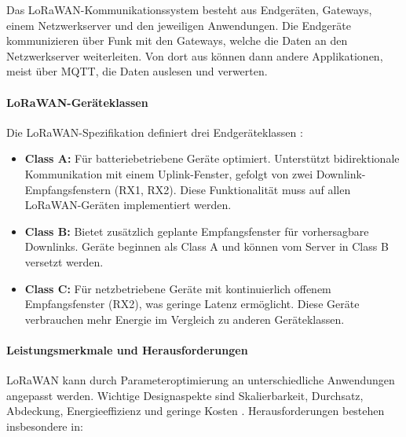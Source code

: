 Das LoRaWAN-Kommunikationssystem besteht aus Endgeräten, Gateways, einem Netzwerkserver und den jeweiligen Anwendungen. Die Endgeräte kommunizieren über Funk mit den Gateways, welche die Daten an den Netzwerkserver weiterleiten. Von dort aus können dann andere Applikationen, meist über MQTT, die Daten auslesen und verwerten. 

\paragraph*{LoRaWAN-Geräteklassen}
Die LoRaWAN-Spezifikation definiert drei Endgeräteklassen \autocite{sornin2015lorawan}:

\begin{itemize}
    \item \textbf{Class A:} Für batteriebetriebene Geräte optimiert. Unterstützt bidirektionale Kommunikation mit einem Uplink-Fenster, gefolgt von zwei Downlink-Empfangsfenstern (RX1, RX2). Diese Funktionalität muss auf allen LoRaWAN-Geräten implementiert werden.
    
    \item \textbf{Class B:} Bietet zusätzlich geplante Empfangsfenster für vorhersagbare Downlinks. Geräte beginnen als Class A und können vom Server in Class B versetzt werden.
    
    \item \textbf{Class C:} Für netzbetriebene Geräte mit kontinuierlich offenem Empfangsfenster (RX2), was geringe Latenz ermöglicht. Diese Geräte verbrauchen mehr Energie im Vergleich zu anderen Geräteklassen.
\end{itemize}

\paragraph*{Leistungsmerkmale und Herausforderungen}
LoRaWAN kann durch Parameteroptimierung an unterschiedliche Anwendungen angepasst werden. Wichtige Designaspekte sind Skalierbarkeit, Durchsatz, Abdeckung, Energieeffizienz und geringe Kosten \cite{bor2017lora}. Herausforderungen bestehen insbesondere in:

